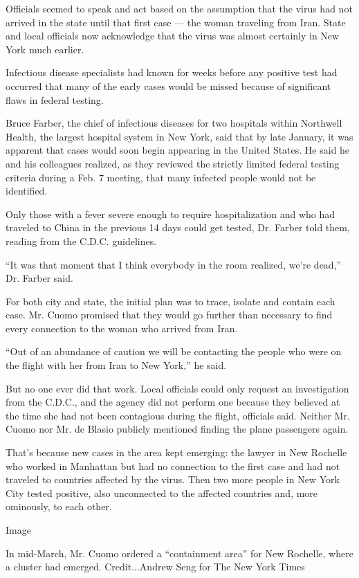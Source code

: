 Officials seemed to speak and act based on the assumption that the virus
had not arrived in the state until that first case --- the woman
traveling from Iran. State and local officials now acknowledge that the
virus was almost certainly in New York much earlier.

Infectious disease specialists had known for weeks before any positive
test had occurred that many of the early cases would be missed because
of significant flaws in federal testing.

Bruce Farber, the chief of infectious diseases for two hospitals within
Northwell Health, the largest hospital system in New York, said that by
late January, it was apparent that cases would soon begin appearing in
the United States. He said he and his colleagues realized, as they
reviewed the strictly limited federal testing criteria during a Feb. 7
meeting, that many infected people would not be identified.

Only those with a fever severe enough to require hospitalization and who
had traveled to China in the previous 14 days could get tested, Dr.
Farber told them, reading from the C.D.C. guidelines.

``It was that moment that I think everybody in the room realized, we're
dead,'' Dr. Farber said.

For both city and state, the initial plan was to trace, isolate and
contain each case. Mr. Cuomo promised that they would go further than
necessary to find every connection to the woman who arrived from Iran.

``Out of an abundance of caution we will be contacting the people who
were on the flight with her from Iran to New York,'' he said.

But no one ever did that work. Local officials could only request an
investigation from the C.D.C., and the agency did not perform one
because they believed at the time she had not been contagious during the
flight, officials said. Neither Mr. Cuomo nor Mr. de Blasio publicly
mentioned finding the plane passengers again.

That's because new cases in the area kept emerging: the lawyer in New
Rochelle who worked in Manhattan but had no connection to the first case
and had not traveled to countries affected by the virus. Then two more
people in New York City tested positive, also unconnected to the
affected countries and, more ominously, to each other.

Image

In mid-March, Mr. Cuomo ordered a ``containment area'' for New Rochelle,
where a cluster had emerged. Credit...Andrew Seng for The New York Times


